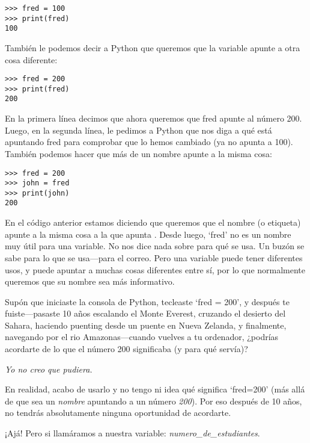\begin{listing}
\begin{verbatim}
>>> fred = 100
>>> print(fred)
100
\end{verbatim}
\end{listing}

También le podemos decir a Python que queremos que la variable  apunte a otra cosa diferente:

\begin{listing}
\begin{verbatim}
>>> fred = 200
>>> print(fred)
200
\end{verbatim}
\end{listing}

\noindent
En la primera línea decimos que ahora queremos que fred apunte al número 200. Luego, en la segunda línea, le pedimos a Python que nos diga a qué está apuntando fred para comprobar que lo hemos cambiado (ya no apunta a 100). También podemos hacer que más de un nombre apunte a la misma cosa:

\begin{listing}
\begin{verbatim}
>>> fred = 200
>>> john = fred
>>> print(john)
200
\end{verbatim}
\end{listing}

En el código anterior estamos diciendo que queremos que el nombre (o etiqueta)  apunte a la misma cosa a la que apunta .
Desde luego, `fred' no es un nombre muy útil para una variable. No nos dice nada sobre para qué se usa. Un buzón se sabe para lo que se usa---para el correo. Pero una variable puede tener diferentes usos, y puede apuntar a muchas cosas diferentes entre sí, por lo que normalmente queremos que su nombre sea más informativo.
\par
Supón que iniciaste la consola de Python, tecleaste `fred = 200', y después te fuiste---pasaste 10 años escalando el Monte Everest, cruzando el desierto del Sahara, haciendo puenting desde un puente en Nueva Zelanda, y finalmente, navegando por el rio Amazonas---cuando vuelves a tu ordenador, ¿podrías acordarte de lo que el número 200 significaba (y para qué servía)?

\noindent
\emph{Yo no creo que pudiera.}

\noindent
En realidad, acabo de usarlo y no tengo ni idea qué significa `fred=200' (más allá de que sea un \emph{nombre} apuntando a un número \emph{200}).  Por eso después de 10 años, no tendrás absolutamente ninguna oportunidad de acordarte.
\par
¡Ajá! Pero si llamáramos a nuestra variable: \emph{numero\_de\_estudiantes}.

